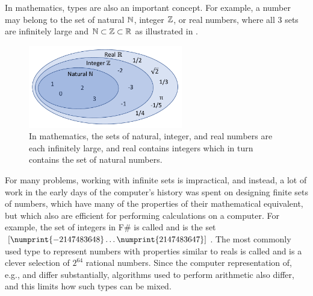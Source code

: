 \documentclass[springer.tex]{subfiles}
\begin{document}
In mathematics, types are also an important concept. For example, a number may belong to the set of natural $\mathbb{N}$, integer $\mathbb{Z}$, or real numbers, where all 3 sets are infinitely large and $\mathbb{N}\subset\mathbb{Z}\subset\mathbb{R}$ as illustrated in .
\begin{figure} %
  \centering
  \includegraphics[width=0.6\textwidth]{numbers}
  \caption{In mathematics, the sets of natural, integer, and real numbers are each infinitely large, and real contains integers which in turn contains the set of natural numbers.}
  \label{fig:numbers}
\end{figure}
For many problems, working with infinite sets is impractical, and instead, a lot of work in the early days of the computer's history was spent on designing finite sets of numbers, which have many of the properties of their mathematical equivalent, but which also are efficient for performing calculations on a computer. For example, the set of integers in F\# is called  and is the set $[\numprint{-2147483648} \ldots \numprint{2147483647}]$. The most commonly used type to represent numbers with properties similar to reals is called  and is a clever selection of $2^{64}$ rational numbers. Since the computer representation of, e.g.,  and  differ substantially, algorithms used to perform arithmetic also differ, and this limits how such types can be mixed.
\end{document}
